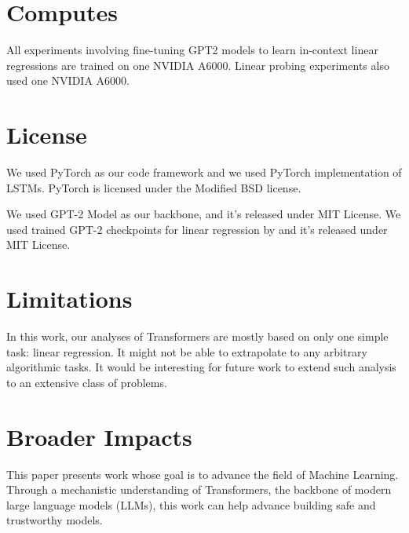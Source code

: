 \documentclass[11pt]{article}
\theoremstyle{plain}
\theoremstyle{definition}
\theoremstyle{remark}
\begin{document}
\section{Computes} \label{sec:compute}
All experiments involving fine-tuning GPT2 models to learn in-context linear regressions are trained on one NVIDIA A6000. Linear probing experiments also used one NVIDIA A6000. 
\section{License} \label{sec:license}
We used PyTorch \cite{paszke2019pytorch} as our code framework and we used PyTorch implementation of LSTMs. PyTorch is licensed under the Modified BSD license.

We used GPT-2 Model as our backbone, and it's released under MIT License. We used trained GPT-2 checkpoints for linear regression by \cite{Garg2022WhatCT} and it's released under MIT License. 

\section{Limitations} \label{sec:limitations}
In this work, our analyses of Transformers are mostly based on only one simple task: linear regression. It might not be able to extrapolate to any arbitrary algorithmic tasks. It would be interesting for future work to extend such analysis to an extensive class of problems. 

\section{Broader Impacts} \label{sec:impacts}
This paper presents work whose goal is to advance the field of Machine Learning. Through a mechanistic understanding of Transformers, the backbone of modern large language models (LLMs), this work can help advance building safe and trustworthy models.

\fi
\end{document}
